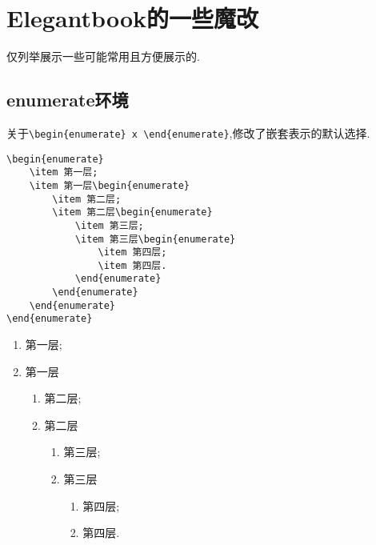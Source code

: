 \documentclass[lang=cn,12pt,scheme=chinese,mode=simple,black]{elegantbook}
\begin{document}
\newpage
\section{Elegantbook的一些魔改}
仅列举展示一些可能常用且方便展示的.

\subsection{enumerate环境}
关于\verb|\begin{enumerate} x \end{enumerate}|,修改了嵌套表示的默认选择.

\begin{lstlisting}
\begin{enumerate}
    \item 第一层;
    \item 第一层\begin{enumerate}
        \item 第二层;
        \item 第二层\begin{enumerate}
            \item 第三层;
            \item 第三层\begin{enumerate}
                \item 第四层;
                \item 第四层.
            \end{enumerate}
        \end{enumerate}
    \end{enumerate}
\end{enumerate}
\end{lstlisting}

\begin{resultbox}
    \begin{enumerate}
        \item 第一层;
        \item 第一层\begin{enumerate}
                  \item 第二层;
                  \item 第二层\begin{enumerate}
                            \item 第三层;
                            \item 第三层\begin{enumerate}
                                      \item 第四层;
                                      \item 第四层.
                                  \end{enumerate}
                        \end{enumerate}
              \end{enumerate}
    \end{enumerate}
\end{resultbox}
\end{document}
